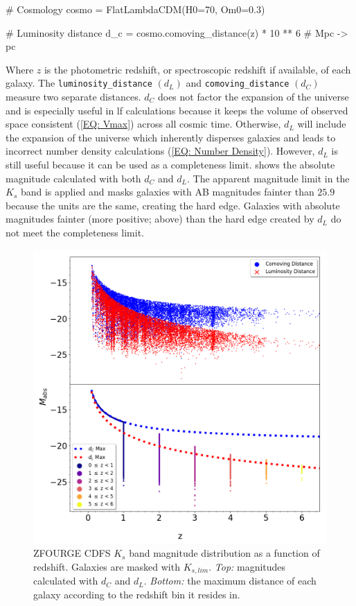 \vspace{12pt}
\begin{python}    
    # Cosmology
    cosmo = FlatLambdaCDM(H0=70, Om0=0.3)
    
    # Luminosity distance
    d_c = cosmo.comoving_distance(z) * 10 ** 6 # Mpc -> pc
\end{python}

Where $z$ is the photometric redshift, or spectroscopic redshift if available, of each galaxy. The \texttt{luminosity\_distance} $(d_L)$ and \texttt{comoving\_distance} $(d_C)$ measure two separate distances. $d_C$ does not factor the expansion of the universe and is especially useful in \gls{lf} calculations because it keeps the volume of observed space consistent (\cref{EQ: Vmax}) across all cosmic time. Otherwise, $d_L$ will include the expansion of the universe which inherently disperses galaxies and leads to incorrect number density calculations (\cref{EQ: Number Density}). However, $d_L$ is still useful because it can be used as a completeness limit.  shows the absolute magnitude calculated with both $d_C$ and $d_L$. The apparent magnitude limit in the $K_{s}$ band is applied and masks galaxies with AB magnitudes fainter than $25.9$ because the units are the same, creating the hard edge. Galaxies with absolute magnitudes fainter (more positive; above) than the hard edge created by $d_L$ do not meet the completeness limit. 

\begin{figure}[t!]
    \centering
    \includegraphics[width=\textwidth]{Figures/Magnitude Distribution.png}
    \caption{ZFOURGE CDFS $K_s$ band magnitude distribution as a function of redshift. Galaxies are masked with $K_{s,lim}$. \textit{Top:} magnitudes calculated with $d_C$ and $d_L$. \textit{Bottom:} the maximum distance of each galaxy according to the redshift bin it resides in.}
    \label{Fig: Magnitude Distribution}
\end{figure}

